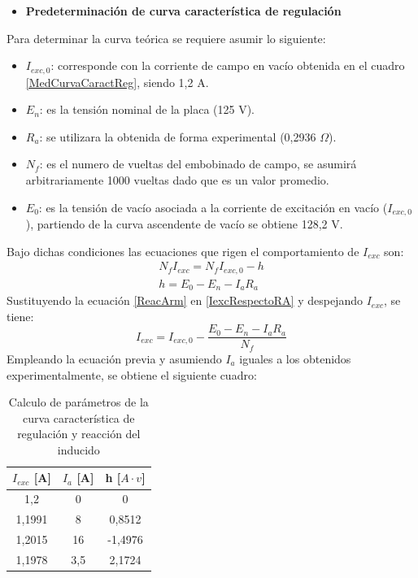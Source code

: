 \documentclass[11pt,letterpaper]{article}     %
\begin{document}
\begin{itemize}
	\item \textbf{Predeterminación de curva característica de regulación}
\end{itemize}
Para determinar la curva teórica se requiere asumir lo siguiente:
\begin{itemize}
	\item $I_{exc,0}$: corresponde con la corriente de campo en vacío obtenida en el cuadro \ref{MedCurvaCaractReg}, siendo 1,2 A.
	\item $E_{n}$: es la tensión nominal de la placa (125 V).
	\item $R_{a}$: se utilizara la obtenida de forma experimental (0,2936 $\Omega$).
	\item $N_{f}$: es el numero de vueltas del embobinado de campo, se asumirá arbitrariamente 1000 vueltas dado que es un valor promedio.
	\item $E_{0}$: es la tensión de vacío asociada a la corriente de excitación en vacío ($I_{exc,0}$), partiendo de la curva ascendente de vacío se obtiene 128,2 V.
\end{itemize}
Bajo dichas condiciones las ecuaciones que rigen el comportamiento de $I_{exc}$ son:
\begin{align}
	N_{f}I_{exc} = N_{f}I_{exc,0} - h \label{IexcRespectoRA}\\
	h = E_{0}-E_{n}-I_{a}R_{a}\label{ReacArm}
\end{align}
Sustituyendo la ecuación \ref{ReacArm} en \ref{IexcRespectoRA} y despejando $I_{exc}$, se tiene:
\begin{equation}
	I_{exc} = I_{exc,0} - \frac{E_{0}-E_{n}-I_{a}R_{a}}{N_{f}}\label{IexcCalculada}
\end{equation}
Empleando la ecuación previa y asumiendo $I_{a}$ iguales a los obtenidos experimentalmente, se obtiene el siguiente cuadro:
\begin{table}[H]
	\centering
	\caption{Calculo de parámetros de la curva característica de regulación y reacción del inducido}
	\label{predeterCaractReg}
	\begin{tabular}{|c|c|c|}
		\hline
		\textbf{$I_{exc}$ {[}A{]}} & \textbf{$I_{a}$ {[}A{]}} & \textbf{h {[}$A\cdot v${]}} \\ \hline
		1,2                        & 0                        & 0                           \\ \hline
		1,1991                     & 8                        & 0,8512                      \\ \hline
		1,2015                     & 16                       & -1,4976                     \\ \hline
		1,1978                     & 3,5                      & 2,1724                      \\ \hline
	\end{tabular}
\end{table}
\end{document}
